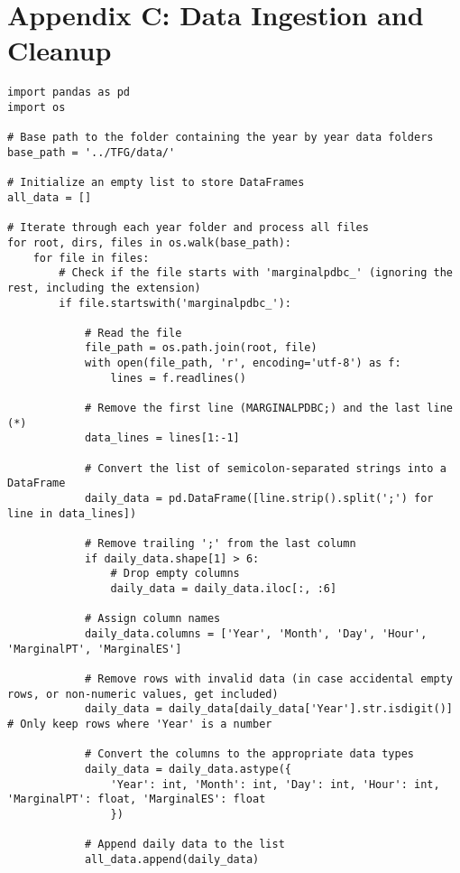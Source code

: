 \documentclass[12pt]{report} %
\begin{document}
\chapter* {Appendix C: Data Ingestion and Cleanup}
\label{app:appendix_c_ingestion_n_cleanup}

\begin{lstlisting}
import pandas as pd
import os

# Base path to the folder containing the year by year data folders
base_path = '../TFG/data/'

# Initialize an empty list to store DataFrames
all_data = []

# Iterate through each year folder and process all files
for root, dirs, files in os.walk(base_path):
    for file in files:
        # Check if the file starts with 'marginalpdbc_' (ignoring the rest, including the extension)
        if file.startswith('marginalpdbc_'):
            
            # Read the file
            file_path = os.path.join(root, file)
            with open(file_path, 'r', encoding='utf-8') as f:
                lines = f.readlines()

            # Remove the first line (MARGINALPDBC;) and the last line (*)
            data_lines = lines[1:-1]
            
            # Convert the list of semicolon-separated strings into a DataFrame
            daily_data = pd.DataFrame([line.strip().split(';') for line in data_lines])
            
            # Remove trailing ';' from the last column
            if daily_data.shape[1] > 6:
                # Drop empty columns
                daily_data = daily_data.iloc[:, :6]
            
            # Assign column names
            daily_data.columns = ['Year', 'Month', 'Day', 'Hour', 'MarginalPT', 'MarginalES']
            
            # Remove rows with invalid data (in case accidental empty rows, or non-numeric values, get included)
            daily_data = daily_data[daily_data['Year'].str.isdigit()]  # Only keep rows where 'Year' is a number
            
            # Convert the columns to the appropriate data types
            daily_data = daily_data.astype({
                'Year': int, 'Month': int, 'Day': int, 'Hour': int, 'MarginalPT': float, 'MarginalES': float
                })
            
            # Append daily data to the list
            all_data.append(daily_data)


\end{lstlisting}
\end{document}
